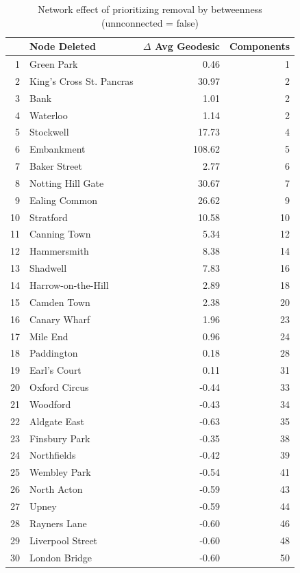 \documentclass[11pt]{article} %
\begin{document}
%

\begin{table}[htbp]
\centering
\begin{tabular}{|r|l|r|r|}
\hline
\multicolumn{1}{|l|}{} & Node Deleted & \multicolumn{1}{l|}{$\Delta$ Avg Geodesic} & \multicolumn{1}{l|}{Components} \\ \hline
1 & Green Park & 0.46 & 1 \\ 
2 & King's Cross St. Pancras & 30.97 & 2 \\ 
3 & Bank & 1.01 & 2 \\ 
4 & Waterloo & 1.14 & 2 \\ 
5 & Stockwell & 17.73 & 4 \\ 
6 & Embankment & 108.62 & 5 \\ 
7 & Baker Street & 2.77 & 6 \\ 
8 & Notting Hill Gate & 30.67 & 7 \\ 
9 & Ealing Common & 26.62 & 9 \\ 
10 & Stratford & 10.58 & 10 \\ 
11 & Canning Town & 5.34 & 12 \\ 
12 & Hammersmith & 8.38 & 14 \\ 
13 & Shadwell & 7.83 & 16 \\ 
14 & Harrow-on-the-Hill & 2.89 & 18 \\ 
15 & Camden Town & 2.38 & 20 \\ 
16 & Canary Wharf & 1.96 & 23 \\ 
17 & Mile End & 0.96 & 24 \\ 
18 & Paddington & 0.18 & 28 \\ 
19 & Earl's Court & 0.11 & 31 \\ 
20 & Oxford Circus & -0.44 & 33 \\ 
21 & Woodford & -0.43 & 34 \\ 
22 & Aldgate East & -0.63 & 35 \\ 
23 & Finsbury Park & -0.35 & 38 \\ 
24 & Northfields & -0.42 & 39 \\ 
25 & Wembley Park & -0.54 & 41 \\ 
26 & North Acton & -0.59 & 43 \\ 
27 & Upney & -0.59 & 44 \\ 
28 & Rayners Lane & -0.60 & 46 \\ 
29 & Liverpool Street & -0.60 & 48 \\ 
30 & London Bridge & -0.60 & 50 \\ \hline
\end{tabular}
\caption{Network effect of prioritizing removal by betweenness \\ (unnconnected = false)}
\label{betweenness false}
\end{table}
\end{document}
